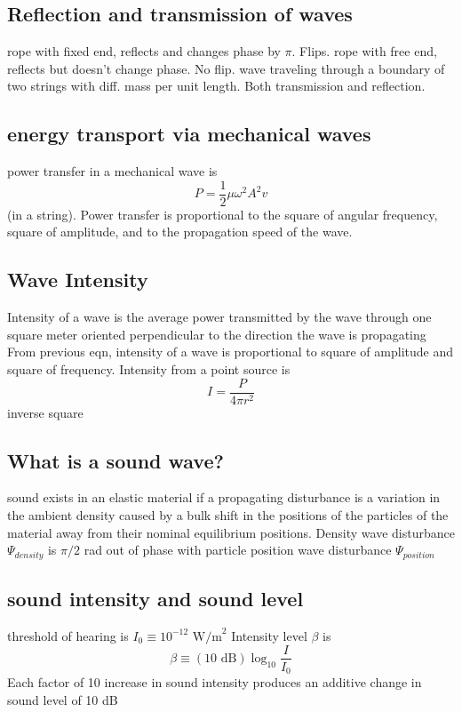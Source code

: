 \documentclass{article}
\begin{document}
\subsection{Reflection and transmission of waves}
\begin{outline}
    \1 rope with fixed end, reflects and changes phase by $\pi$. Flips.
    \1 rope with free end, reflects but doesn't change phase. No flip. 
    \1 wave traveling through a boundary of two strings with diff. mass per unit length. Both transmission and reflection. 
\end{outline}
\subsection{energy transport via mechanical waves}
\begin{outline}
\1 power transfer in a mechanical wave is \[P=\dfrac{1}{2}\mu\omega^2A^2v\] (in a string). Power transfer is proportional to the square of angular frequency, square of amplitude, and to the propagation speed of the wave. 
\end{outline}
\subsection{Wave Intensity}
\begin{outline}
    \1 Intensity of a wave is the average power transmitted by the wave through one square meter oriented perpendicular to the direction the wave is propagating
    \1 From previous eqn, intensity of a wave is proportional to square of amplitude and square of frequency. 
    \1 Intensity from a point source is \[I=\dfrac{P}{4\pi r^2}\] inverse square
\end{outline}
\subsection{What is a sound wave?}
\begin{outline}
    \1 sound exists in an elastic material if a propagating disturbance is a variation in the ambient density caused by a bulk shift in the positions of the particles of the material away from their nominal equilibrium positions. \1 Density wave disturbance $\Psi_{density}$ is $\pi/2$ rad out of phase with particle position wave disturbance $\Psi_{position}$
\end{outline}
\subsection{sound intensity and sound level}
\begin{outline}
    \1 threshold of hearing is \(I_0\equiv10^{-12}\text{ W/m}^2\)
    \1 Intensity level $\beta$ is \[\beta\equiv(10\text{ dB})\log_{10}\dfrac{I}{I_0}\]
    \1 Each factor of 10 increase in sound intensity produces an additive change in sound level of 10 dB
\end{outline}
\end{document}
